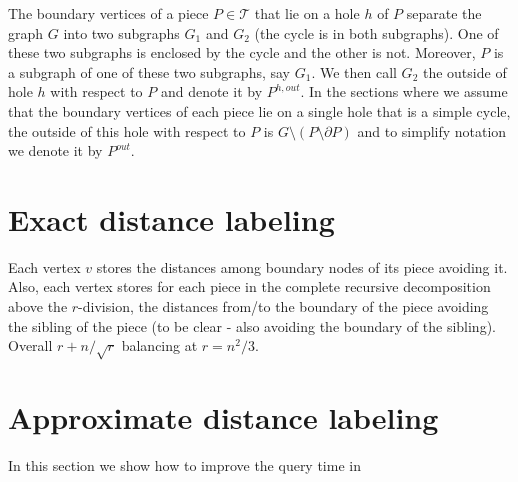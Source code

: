 \documentclass[11pt]{article}
\newcommand{\TG}{\mathcal{T}}
\newcommand{\out}[1]{#1^{out}}
\begin{document}
The boundary vertices of a piece $P \in \TG$ that lie on a hole $h$ of $P$ separate the graph $G$ into two subgraphs $G_1$ and $G_2$ (the cycle is in both subgraphs). One of these two subgraphs is enclosed by the cycle and the other is not. Moreover, $P$ is a subgraph of one of these two subgraphs, say $G_1$. We then call $G_2$ the outside of hole $h$ with respect to $P$ and denote it by $P^{h,out}$.
In the sections where we assume that the boundary vertices of each piece lie on a single hole that is a simple cycle, the outside of this hole with respect to $P$ is $G\setminus(P \setminus \partial P)$ and to simplify notation we denote it by $\out{P}$. 


\section{Exact distance labeling}\label{sec:exact}
Each vertex $v$ stores the distances among boundary nodes of its piece avoiding it. Also, each vertex stores for each piece in the complete recursive decomposition above the $r$-division, the distances from/to the boundary of the piece avoiding the sibling of the piece (to be clear - also avoiding the boundary of the sibling).  Overall $r + n/\sqrt{r}$ balancing at $r = n^2/3$.

\section{Approximate distance labeling}\label{sec:approx}
In this section we show how to improve the query time in~\cite{DBLP:conf/stoc/AbrahamCG12}



\end{document}
